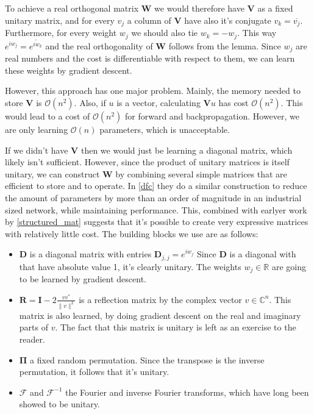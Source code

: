 \documentclass{article} %
\newcommand{\matr}[1]{\mathbf{#1}}
\newcommand\RR{\mathbb{R}}
\begin{document}
To achieve a real orthogonal matrix $\matr{W}$ we would therefore have $\matr{V}$ as a fixed unitary matrix, and for every $v_j$ a column of $\matr{V}$ have also it's conjugate $v_k = \overline{v_j}$. Furthermore, for every weight $w_j$ we should also tie $w_k=-w_j$. This way $e^{i w_j} = \overline{e^{i w_k}}$ and the real orthogonality of $\matr{W}$ follows from the lemma. Since $w_j$ are real numbers and the cost is differentiable with respect to them, we can learn these weights by gradient descent. 

However, this approach has one major problem. Mainly, the memory needed to store $\matr{V}$ is $\mathcal{O}\left(n^2\right)$. Also, if $u$ is a vector, calculating $\matr{V}u$ has cost $\mathcal{O}\left( n^2 \right)$. This would lead to a cost of $\mathcal{O} \left( n^2 \right)$ for forward and backpropagation. However, we are only learning $\mathcal{O}(n)$ parameters, which is unacceptable.

If we didn't have $\matr{V}$ then we would just be learning a diagonal matrix, which likely isn't sufficient. However, since the product of unitary matrices is itself unitary, we can construct $\matr{W}$ by combining several simple matrices that are efficient to store and to operate. In \ref{dfc} they do a similar construction to reduce the amount of parameters by more than an order of magnitude in an industrial sized network, while maintaining performance. This, combined with earlyer work by \ref{structured_mat} suggests that it's possible to create very expressive matrices with relatively little cost. The building blocks we use are as follows:

\begin{itemize}
  \item $\matr{D}$ is a diagonal matrix with entries $\matr{D}_{j,j} = e^{i w_j}$ Since $\matr{D}$ is a diagonal with that have absolute value 1, it's clearly unitary. The weights $w_j \in \RR$ are going to be learned by gradient descent.
  \item $\matr{R} = \matr{I} - 2 \frac{v v^*}{\|v\|^2}$ is a reflection matrix by the complex vector $v \in \mathbb{C}^n$. This matrix is also learned, by doing gradient descent on the real and imaginary parts of $v$. The fact that this matrix is unitary is left as an exercise to the reader.
  \item $\matr{\Pi}$ a fixed random permutation. Since the transpose is the inverse permutation, it follows that it's unitary.
  \item $\mathcal{F}$ and $\mathcal{F}^{-1}$ the Fourier and inverse Fourier transforms, which have long been showed to be unitary.
\end{itemize}
\end{document}
